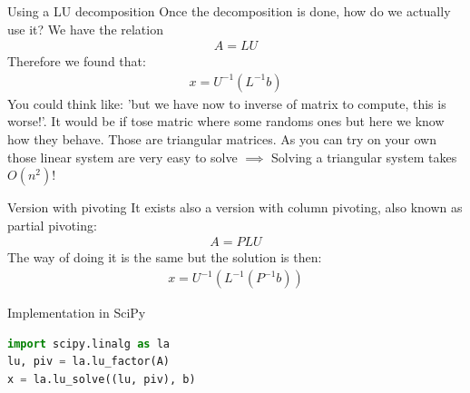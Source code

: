 \begin{parag}{Using a LU decomposition}
    Once the decomposition is done, how do we actually use it? We have the relation
	\begin{align*} A =  LU \end{align*}
	Therefore we found that:
	\begin{align*} x = U^{-1}\left(L^{-1}b\right) \end{align*}
	You could think like: 'but we have now to inverse of matrix to compute, this is worse!'. It would be if tose matric where some randoms ones but here we know how they behave. Those are triangular matrices. As you can try on your own those linear system are very easy to solve $\implies$ Solving a triangular system takes $O\left(n^2\right)$!
\end{parag}
\begin{parag}{Version with pivoting}
	It exists also a version with column pivoting, also known as partial pivoting:
	\begin{align*} A = PLU \end{align*}
	The way of doing it is the same but the solution is then:
	\begin{align*} x = U^{-1}\left(L^{-1}\left(P^{-1}b\right)\right) \end{align*}
	\begin{subparag}{Implementation in SciPy}
		\begin{lstlisting}[language=python]
import scipy.linalg as la 
lu, piv = la.lu_factor(A)
x = la.lu_solve((lu, piv), b)
	    \end{lstlisting}
	    
	\end{subparag}
\end{parag}


